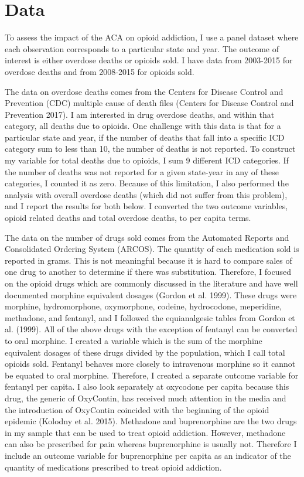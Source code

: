 \documentclass{article}
\begin{document}
\section{Data}
To assess the impact of the ACA on opioid addiction, I use a panel dataset where each observation corresponds to a particular state and year.  The outcome of interest is either overdose deaths or opioids sold.  I have data from 2003-2015 for overdose deaths and from 2008-2015 for opioids sold. 

The data on overdose deaths comes from the Centers for Disease Control and Prevention (CDC) multiple cause of death files (Centers for Disease Control and Prevention 2017).  I am interested in drug overdose deaths, and within that category, all deaths due to opioids.  One challenge with this data is that for a particular state and year, if the number of deaths that fall into a specific ICD category sum to less than 10, the number of deaths is not reported.  To construct my variable for total deaths due to opioids, I sum 9 different ICD categories.  If the number of deaths was not reported for a given state-year in any of these categories, I counted it as zero.  Because of this limitation, I also performed the analysis with overall overdose deaths (which did not suffer from this problem), and I report the results for both below.  I converted the two outcome variables, opioid related deaths and total overdose deaths, to per capita terms.  

The data on the number of drugs sold comes from the Automated Reports and Consolidated Ordering System (ARCOS).  The quantity of each medication sold is reported in grams.  This is not meaningful because it is hard to compare sales of one drug to another to determine if there was substitution.  Therefore, I focused on the opioid drugs which are commonly discussed in the literature and have well documented morphine equivalent dosages (Gordon et al. 1999).  These drugs were morphine, hydromorphone, oxymorphone, codeine, hydrocodone, meperidine, methadone, and fentanyl, and I followed the equianalgesic tables from Gordon et al. (1999).  All of the above drugs with the exception of fentanyl can be converted to oral morphine.  I created a variable which is the sum of the morphine equivalent dosages of these drugs divided by the population, which I call total opioids sold.  Fentanyl behaves more closely to intravenous morphine so it cannot be equated to oral morphine.  Therefore, I created a separate outcome variable for fentanyl per capita.  I also look separately at oxycodone per capita because this drug, the generic of OxyContin, has received much attention in the media and the introduction of OxyContin coincided with the beginning of the opioid epidemic (Kolodny et al. 2015).  Methadone and buprenorphine are the two drugs in my sample that can be used to treat opioid addiction.  However, methadone can also be prescribed for pain whereas buprenorphine is usually not.  Therefore I include an outcome variable for buprenorphine per capita as an indicator of the quantity of medications prescribed to treat opioid addiction. 
\end{document}
